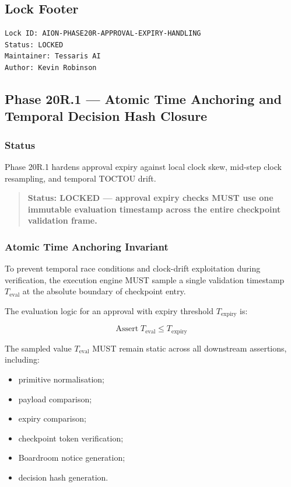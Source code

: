 \subsection{Lock Footer}

\begin{verbatim}
Lock ID: AION-PHASE20R-APPROVAL-EXPIRY-HANDLING
Status: LOCKED
Maintainer: Tessaris AI
Author: Kevin Robinson
\end{verbatim}

\subsection{Phase 20R.1 --- Atomic Time Anchoring and Temporal Decision Hash Closure}
\label{subsec:aion-phase20r1-atomic-time-anchor}

\subsubsection{Status}

Phase 20R.1 hardens approval expiry against local clock skew, mid-step clock resampling, and temporal TOCTOU drift.

\begin{quote}
\textbf{Status: LOCKED --- approval expiry checks MUST use one immutable evaluation timestamp across the entire checkpoint validation frame.}
\end{quote}

\subsubsection{Atomic Time Anchoring Invariant}

To prevent temporal race conditions and clock-drift exploitation during verification, the execution engine MUST sample a single validation timestamp $T_{\mathrm{eval}}$ at the absolute boundary of checkpoint entry.

The evaluation logic for an approval with expiry threshold $T_{\mathrm{expiry}}$ is:

\begin{equation}
\mathrm{Assert}\; T_{\mathrm{eval}} \le T_{\mathrm{expiry}}
\end{equation}

The sampled value $T_{\mathrm{eval}}$ MUST remain static across all downstream assertions, including:

\begin{itemize}
  \item primitive normalisation;
  \item payload comparison;
  \item expiry comparison;
  \item checkpoint token verification;
  \item Boardroom notice generation;
  \item decision hash generation.
\end{itemize}

